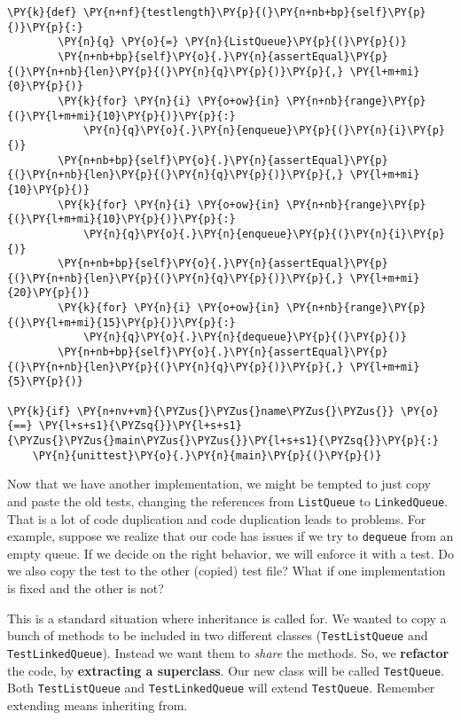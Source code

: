 \begin{Verbatim}[commandchars=\\\{\}]
    \PY{k}{def} \PY{n+nf}{testlength}\PY{p}{(}\PY{n+nb+bp}{self}\PY{p}{)}\PY{p}{:}
        \PY{n}{q} \PY{o}{=} \PY{n}{ListQueue}\PY{p}{(}\PY{p}{)}
        \PY{n+nb+bp}{self}\PY{o}{.}\PY{n}{assertEqual}\PY{p}{(}\PY{n+nb}{len}\PY{p}{(}\PY{n}{q}\PY{p}{)}\PY{p}{,} \PY{l+m+mi}{0}\PY{p}{)}
        \PY{k}{for} \PY{n}{i} \PY{o+ow}{in} \PY{n+nb}{range}\PY{p}{(}\PY{l+m+mi}{10}\PY{p}{)}\PY{p}{:}
            \PY{n}{q}\PY{o}{.}\PY{n}{enqueue}\PY{p}{(}\PY{n}{i}\PY{p}{)}
        \PY{n+nb+bp}{self}\PY{o}{.}\PY{n}{assertEqual}\PY{p}{(}\PY{n+nb}{len}\PY{p}{(}\PY{n}{q}\PY{p}{)}\PY{p}{,} \PY{l+m+mi}{10}\PY{p}{)}
        \PY{k}{for} \PY{n}{i} \PY{o+ow}{in} \PY{n+nb}{range}\PY{p}{(}\PY{l+m+mi}{10}\PY{p}{)}\PY{p}{:}
            \PY{n}{q}\PY{o}{.}\PY{n}{enqueue}\PY{p}{(}\PY{n}{i}\PY{p}{)}
        \PY{n+nb+bp}{self}\PY{o}{.}\PY{n}{assertEqual}\PY{p}{(}\PY{n+nb}{len}\PY{p}{(}\PY{n}{q}\PY{p}{)}\PY{p}{,} \PY{l+m+mi}{20}\PY{p}{)}
        \PY{k}{for} \PY{n}{i} \PY{o+ow}{in} \PY{n+nb}{range}\PY{p}{(}\PY{l+m+mi}{15}\PY{p}{)}\PY{p}{:}
            \PY{n}{q}\PY{o}{.}\PY{n}{dequeue}\PY{p}{(}\PY{p}{)}
        \PY{n+nb+bp}{self}\PY{o}{.}\PY{n}{assertEqual}\PY{p}{(}\PY{n+nb}{len}\PY{p}{(}\PY{n}{q}\PY{p}{)}\PY{p}{,} \PY{l+m+mi}{5}\PY{p}{)}

\PY{k}{if} \PY{n+nv+vm}{\PYZus{}\PYZus{}name\PYZus{}\PYZus{}} \PY{o}{==} \PY{l+s+s1}{\PYZsq{}}\PY{l+s+s1}{\PYZus{}\PYZus{}main\PYZus{}\PYZus{}}\PY{l+s+s1}{\PYZsq{}}\PY{p}{:}
    \PY{n}{unittest}\PY{o}{.}\PY{n}{main}\PY{p}{(}\PY{p}{)}
\end{Verbatim}



Now that we have another implementation, we might be tempted to just copy and paste the old tests, changing the references from \texttt{ListQueue} to \texttt{LinkedQueue}.
That is a lot of code duplication and code duplication leads to problems.
For example, suppose we realize that our code has issues if we try to \texttt{dequeue} from an empty queue.
If we decide on the right behavior, we will enforce it with a test.
Do we also copy the test to the other (copied) test file?
What if one implementation is fixed and the other is not?


This is a standard situation where inheritance is called for.
We wanted to copy a bunch of methods to be included in two different classes (\texttt{TestListQueue} and \texttt{TestLinkedQueue}).
Instead we want them to \emph{share} the methods.
So, we \textbf{refactor} the code, by \textbf{extracting a superclass}.
Our new class will be called \texttt{TestQueue}.
Both \texttt{TestListQueue} and \texttt{TestLinkedQueue} will extend \texttt{TestQueue}.
Remember extending means inheriting from.


